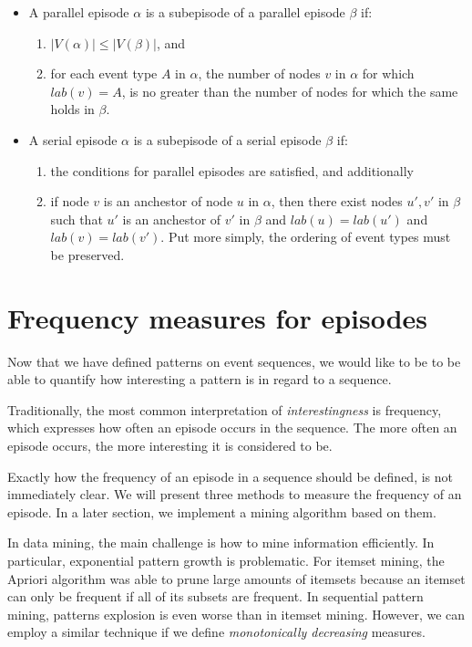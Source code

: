 \begin{itemize}
\item A parallel episode $ \alpha $ is a subepisode of a parallel episode $ \beta $ if:
\begin{enumerate}
\item $ | V(\alpha) | \leq | V(\beta) | $, and
\item for each event type $ A $ in $ \alpha $, the number of nodes $ v $ in $ \alpha $ for which $ lab(v) = A $, is no greater than the number of nodes for which the same holds in $ \beta $.
\end{enumerate}
\item A serial episode $ \alpha $ is a subepisode of a serial episode $ \beta $ if:
\begin{enumerate}
\item the conditions for parallel episodes are satisfied, and additionally
\item if node $ v $ is an anchestor of node $ u $ in $ \alpha $, then there exist nodes $ u', v' $ in $ \beta $ such that $ u' $ is an anchestor of $ v' $ in $ \beta $ and $ lab(u) = lab(u') $ and $ lab(v) = lab(v') $. Put more simply, the ordering of event types must be preserved.
\end{enumerate}
\end{itemize}

\section{Frequency measures for episodes}
\label{sec:interestingness-measures-episodes}

Now that we have defined patterns on event sequences, we would like to be to be able to quantify how interesting a pattern is in regard to a sequence.

Traditionally, the most common interpretation of \emph{interestingness} is frequency, which expresses how often an episode occurs in the sequence. The more often an episode occurs, the more interesting it is considered to be.

Exactly how the frequency of an episode in a sequence should be defined, is not immediately clear. We will present three methods to measure the frequency of an episode. In a later section, we implement a mining algorithm based on them.

In data mining, the main challenge is how to mine information efficiently. In particular, exponential pattern growth is problematic. For itemset mining, the Apriori algorithm \cite{agrawal1994fast} was able to prune large amounts of itemsets because an itemset can only be frequent if all of its subsets are frequent. In sequential pattern mining, patterns explosion is even worse than in itemset mining. However, we can employ a similar technique if we define \emph{monotonically decreasing} measures.

